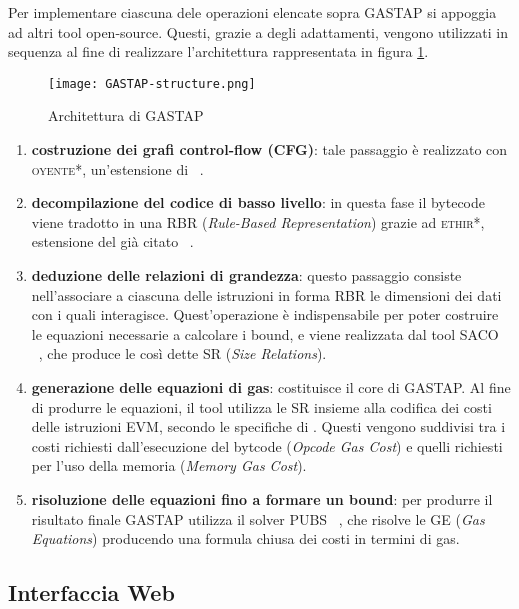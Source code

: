     Per implementare ciascuna dele operazioni elencate sopra GASTAP si appoggia ad altri tool open-source. Questi, grazie a degli adattamenti, vengono utilizzati in sequenza al fine di realizzare l'architettura rappresentata in figura \ref{fig:gstp-struct}.\newline 
    
    \begin{figure}[h]
        \centering
        \texttt{[image: GASTAP-structure.png]}
        \caption{Architettura di GASTAP}
        \label{fig:gstp-struct}
    \end{figure}
    
    \begin{enumerate}
        \item \textbf{costruzione dei grafi control-flow (CFG)}: tale passaggio è realizzato con \textsc{oyente*}, un'estensione di ~\cite{melonproject/oyente}.
        \item \textbf{decompilazione del codice di basso livello}: in questa fase il bytecode viene tradotto in una RBR (\textit{Rule-Based Representation}) grazie ad \textsc{ethir*}, estensione del già citato ~\cite{albert2018ethir}.
        \item \textbf{deduzione delle relazioni di grandezza}: questo passaggio consiste nell'associare a ciascuna delle istruzioni in forma RBR le dimensioni dei dati con i quali interagisce. Quest'operazione è indispensabile per poter costruire le equazioni necessarie a calcolare i bound, e viene realizzata dal tool SACO ~\cite{10.1007/978-3-642-54862-8_46}, che produce le così dette SR (\textit{Size Relations}).
        \item \textbf{generazione delle equazioni di gas}: costituisce il core di GASTAP. Al fine di produrre le equazioni, il tool utilizza le SR insieme alla codifica dei costi delle istruzioni EVM, secondo le specifiche di \cite{wood2014ethereum}. Questi vengono suddivisi tra i costi richiesti dall'esecuzione del bytcode (\textit{Opcode Gas Cost}) e quelli richiesti per l'uso della memoria (\textit{Memory Gas Cost}). 
        \item \textbf{risoluzione delle equazioni fino a formare un bound}: per produrre il risultato finale GASTAP utilizza il solver PUBS ~\cite{albert2008automatic}, che risolve le GE (\textit{Gas Equations}) producendo una formula chiusa dei costi in termini di gas. 
    \end{enumerate}

    \subsection{Interfaccia Web}
    
